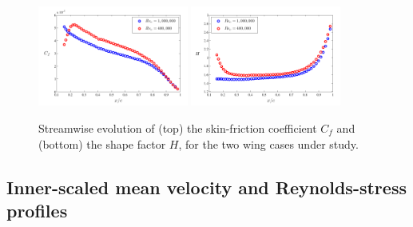 \documentclass[preprint,12pt,authoryear]{elsarticle}
\begin{document}
\begin{figure}[t]
\centering
\includegraphics[width=0.44\textwidth]{Cf_vs_x}
\includegraphics[width=0.44\textwidth]{H_vs_x}
\caption{Streamwise evolution of (top) the skin-friction coefficient $C_{f}$ and (bottom) the shape factor $H$, for the two wing cases under study.}
\label{Cf_H}
\end{figure}

\subsection{Inner-scaled mean velocity and Reynolds-stress profiles}
\end{document}
